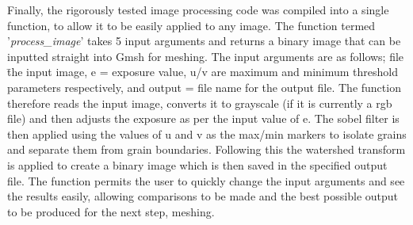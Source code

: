 \documentclass[\report.tex]{subfiles}
\begin{document}
\noindent Finally, the rigorously tested image processing code was compiled into a single function, to allow it to be easily applied to any image. The function termed '\emph{process_image}' takes 5 input arguments and returns a binary image that can be inputted straight into Gmsh for meshing. The input arguments are as follows; file \= the input image, e = exposure value, u/v are maximum and minimum threshold parameters respectively, and output = file name for the output file. The function therefore reads the input image, converts it to grayscale (if it is currently a rgb file) and then adjusts the exposure as per the input value of e. The sobel filter is then applied using the values of u and v as the max/min markers to isolate grains and separate them from grain boundaries. Following this the watershed transform is applied to create a binary image which is then saved in the specified output file. The function permits the user to quickly change the input arguments and see the results easily, allowing comparisons to be made and the best possible output to be produced for the next step, meshing.
\end{document}

